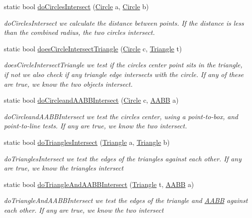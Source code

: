\begin{DoxyCompactItemize}
static bool \hyperlink{class_intersect_tester_a5ce26d69bdb46983fb96516c8a8e1b55}{do\+Circles\+Intersect} (\hyperlink{class_circle}{Circle} a, \hyperlink{class_circle}{Circle} b)
\begin{DoxyCompactList}\small\item\em do\+Circles\+Intersect we calculate the distance between points. If the distance is less than the combined radius, the two circles intersect. \end{DoxyCompactList}\item 
static bool \hyperlink{class_intersect_tester_a4a2f8f6f66be1f1d432c3e04e919273f}{does\+Circle\+Intersect\+Triangle} (\hyperlink{class_circle}{Circle} c, \hyperlink{class_triangle}{Triangle} t)
\begin{DoxyCompactList}\small\item\em does\+Circle\+Intersect\+Triangle we test if the circle\textquotesingle{}s center point sits in the triangle, if not we also check if any triangle edge intersects with the circle. If any of these are true, we know the two objects intersect. \end{DoxyCompactList}\item 
static bool \hyperlink{class_intersect_tester_af76b72861b57c630e7c54ad9449a2d27}{do\+Circleand\+A\+A\+B\+B\+Intersect} (\hyperlink{class_circle}{Circle} c, \hyperlink{class_a_a_b_b}{A\+A\+BB} a)
\begin{DoxyCompactList}\small\item\em do\+Circleand\+A\+A\+B\+B\+Intersect we test the circle\textquotesingle{}s center, using a point-\/to-\/box, and point-\/to-\/line tests. If any are true, we know the two intersect. \end{DoxyCompactList}\item 
static bool \hyperlink{class_intersect_tester_a42709665c17cf203a7157466fdccd10f}{do\+Triangles\+Intersect} (\hyperlink{class_triangle}{Triangle} a, \hyperlink{class_triangle}{Triangle} b)
\begin{DoxyCompactList}\small\item\em do\+Triangles\+Intersect we test the edges of the triangles against each other. If any are true, we know the triangles intersect \end{DoxyCompactList}\item 
static bool \hyperlink{class_intersect_tester_acb2dbd261f6351d83cf7471a972b5b52}{do\+Triangle\+And\+A\+A\+B\+B\+Intersect} (\hyperlink{class_triangle}{Triangle} t, \hyperlink{class_a_a_b_b}{A\+A\+BB} a)
\begin{DoxyCompactList}\small\item\em do\+Triangle\+And\+A\+A\+B\+B\+Intersect we test the edges of the triangle and \hyperlink{class_a_a_b_b}{A\+A\+BB} against each other. If any are true, we know the two intersect \end{DoxyCompactList}\item 

\end{DoxyCompactItemize}
